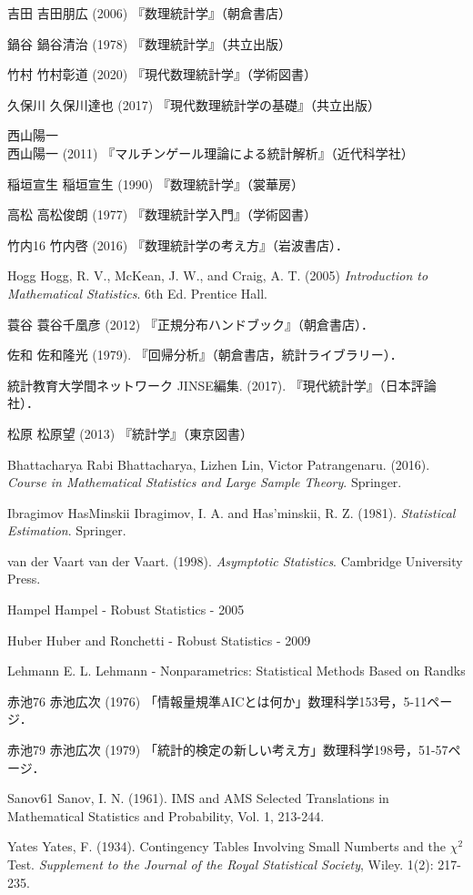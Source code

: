 \documentclass[uplatex,dvipdfmx]{jsreport}
\begin{document}
\begin{thebibliography}{99}
    \item{吉田}
    吉田朋広 (2006) 『数理統計学』（朝倉書店）
    \item{鍋谷}
    鍋谷清治 (1978) 『数理統計学』（共立出版）
    \item{竹村}
    竹村彰道 (2020) 『現代数理統計学』（学術図書）
    \item{久保川}
    久保川達也 (2017) 『現代数理統計学の基礎』（共立出版）
    \item{西山陽一}
    西山陽一 (2011) 『マルチンゲール理論による統計解析』（近代科学社）
    \item{稲垣宣生}
    稲垣宣生 (1990) 『数理統計学』（裳華房）
    \item{高松}
    高松俊朗 (1977) 『数理統計学入門』（学術図書）
    \item{竹内16}
    竹内啓 (2016) 『数理統計学の考え方』（岩波書店）．
    \item{Hogg}
    Hogg, R. V., McKean, J. W., and Craig, A. T. (2005) \textit{Introduction to Mathematical Statistics}. 6th Ed. Prentice Hall.
    \item{蓑谷}
    蓑谷千凰彦 (2012) 『正規分布ハンドブック』（朝倉書店）．

    \item{佐和}
    佐和隆光 (1979). 『回帰分析』（朝倉書店，統計ライブラリー）．
    \item{統計教育大学間ネットワーク}%
    JINSE編集. (2017). 『現代統計学』（日本評論社）．
    \item{松原}
    松原望 (2013) 『統計学』（東京図書）

    \item{Bhattacharya}
    Rabi Bhattacharya, Lizhen Lin, Victor Patrangenaru. (2016). \textit{Course in Mathematical Statistics and Large Sample Theory}. Springer.
    \item{Ibragimov HasMinskii}
    Ibragimov, I. A. and Has'minskii, R. Z. (1981). \textit{Statistical Estimation}. Springer.
    \item{van der Vaart}
    van der Vaart. (1998). \textit{Asymptotic Statistics}. Cambridge University Press.

    \item{Hampel}
    Hampel - Robust Statistics - 2005
    \item{Huber}
    Huber and Ronchetti - Robust Statistics - 2009
    \item{Lehmann}
    E. L. Lehmann - Nonparametrics: Statistical Methods Based on Randks
    \item{赤池76}
    赤池広次 (1976) 「情報量規準AICとは何か」数理科学153号，5-11ページ．
    \item{赤池79}
    赤池広次 (1979) 「統計的検定の新しい考え方」数理科学198号，51-57ページ．
    \item{Sanov61}
    Sanov, I. N. (1961). IMS and AMS Selected Translations in Mathematical Statistics and Probability, Vol. 1, 213-244.

    \item{Yates}
    Yates, F. (1934). 
    Contingency Tables Involving Small Numberts and the $\chi^2$ Test.
    \textit{Supplement to the Journal of the Royal Statistical Society}, Wiley. 1(2): 217-235.
\end{thebibliography}
\end{document}
